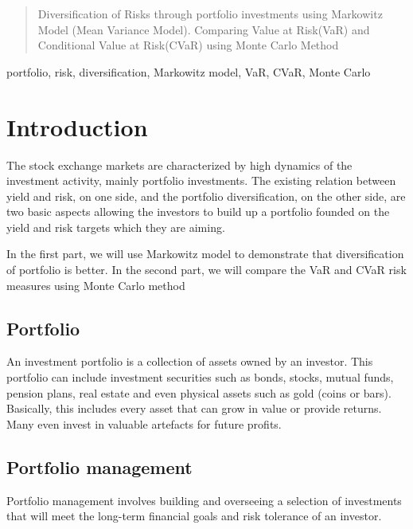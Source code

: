 \documentclass[conference]{IEEEtran}
\begin{document}
\maketitle


\begin{abstract}
Diversification of Risks through portfolio investments using Markowitz Model (Mean Variance Model).
\linebreak
Comparing Value at Risk(VaR) and Conditional Value at Risk(CVaR) using Monte Carlo Method
\end{abstract}

\begin{IEEEkeywords}
portfolio, risk, diversification, Markowitz model, VaR, CVaR, Monte Carlo
\end{IEEEkeywords}

\section{Introduction}
The stock exchange markets are characterized by high dynamics of the investment activity, mainly portfolio investments. The existing relation between yield and risk, on one side, and the portfolio diversification, on the other side, are two basic aspects allowing the investors to build up a portfolio founded on the yield and risk targets which they are aiming. 

In the first part, we will use Markowitz model to demonstrate that diversification of portfolio is better. In the second part, we will compare the VaR and CVaR risk measures using Monte Carlo method

\subsection{Portfolio}
    An investment portfolio is a collection of assets owned by an investor. This portfolio can include investment securities such as bonds, stocks, mutual funds, pension plans, real estate and even physical assets such as gold (coins or bars). Basically, this includes every asset that can grow in value or provide returns. Many even invest in valuable artefacts for future profits.
    

\subsection{Portfolio management}
    Portfolio management involves building and overseeing a selection of investments that will meet the long-term financial goals and risk tolerance of an investor.
    
\end{document}
